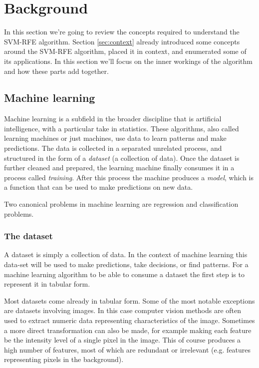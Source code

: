 \chapter{Background}
\label{Chapter4}

In this section we're going to review the concepts required to understand the SVM-RFE algorithm. Section \ref{sec:context} already introduced some concepts around the SVM-RFE algorithm, placed it in context, and enumerated some of its applications. In this section we'll focus on the inner workings of the algorithm and how these parts add together. 

\section{Machine learning}

Machine learning is a subfield in the broader discipline that is artificial intelligence, with a particular take in statistics. These algorithms, also called learning machines or just machines, use data to learn patterns and make predictions. The data is collected in a separated unrelated process, and structured in the form of a \emph{dataset} (a collection of data). Once the dataset is further cleaned and prepared, the learning machine finally consumes it in a process called \emph{training}. After this process the machine pro\-duces a \emph{model}, which is a function that can be used to make predictions on new data.

Two canonical problems in machine learning are regression and classification problems.

\subsection{The dataset}

A dataset is simply a collection of data. In the context of machine learning this data-set will be used to make predictions, take decisions, or find patterns. For a machine learning algorithm to be able to consume a dataset the first step is to represent it in tabular form. 

Most datasets come already in tabular form. Some of the most notable ex\-cep\-tions are datasets involving images. In this case computer vision methods are often used to extract numeric data representing characteristics of the image. Sometimes a more direct transformation can also be made, for example making each feature be the intensity level of a single pixel in the image. This of course produces a high number of features, most of which are redundant or irrelevant (e.g. features representing pixels in the background). 

